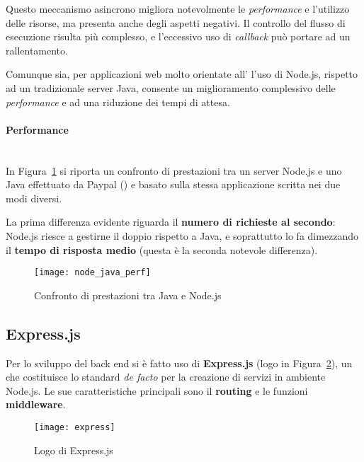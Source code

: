 Questo meccanismo asincrono migliora notevolmente le \textit{performance} e l'utilizzo delle risorse, ma presenta anche degli aspetti negativi. Il controllo del flusso di esecuzione risulta più complesso, e l'eccessivo uso di \textit{callback} può portare ad un rallentamento.

Comunque sia, per applicazioni web molto orientate all' l'uso di Node.js, rispetto ad un tradizionale server Java, consente un miglioramento complessivo delle \textit{performance} e ad una riduzione dei tempi di attesa.

\paragraph{Performance} \mbox{} \\
In Figura~\ref{fig:nodejavaperf} si riporta un confronto di prestazioni tra un server Node.js e uno Java effettuato da Paypal (\cite{site:paypalNode}) e basato sulla stessa applicazione scritta nei due modi diversi.

La prima differenza evidente riguarda il \textbf{numero di richieste al secondo}: Node.js riesce a gestirne il doppio rispetto a Java, e soprattutto lo fa dimezzando il \textbf{tempo di risposta medio} (questa è la seconda notevole differenza).
\begin{figure}[h]
\begin{center}
\texttt{[image: node\_java\_perf]}
\caption[Confronto di prestazioni tra Java e Node.js]{Confronto di prestazioni tra Java e Node.js\protect\footnotemark}
\label{fig:nodejavaperf}
\end{center}
\end{figure}
\newpage
\subsection{Express.js} \label{express}
Per lo sviluppo del back end si è fatto uso di \textbf{Express.js} (logo in Figura~\ref{fig:express}), un  che costituisce lo standard \textit{de facto} per la creazione di servizi  in ambiente Node.js. Le sue caratteristiche principali sono il \textbf{routing} e le funzioni \textbf{middleware}.
\begin{figure}[hbpc]
\begin{center}
\texttt{[image: express]}
\caption[Logo di Express.js]{Logo di Express.js\protect\footnotemark}
\label{fig:express}
\end{center}
\end{figure}

